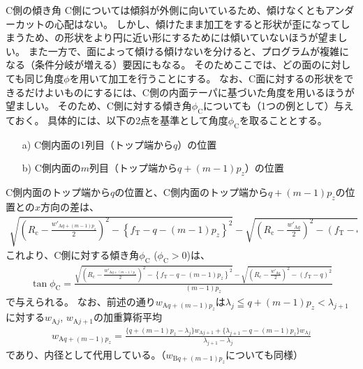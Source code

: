 \begin{Column}{C側\dimple の傾き角}
C側\dimple については傾斜が外側に向いているため、傾けなくともアンダーカットの心配はない。
しかし、傾けたまま加工をすると形状が歪になってしまうため、\dimple の形状をより円に近い形にするためには傾いていないほうが望ましい。
また一方で、面によって傾ける傾けないを分けると、プログラムが複雑になる（条件分岐が増える）要因にもなる。
そのためここでは、どの面の\dimple に対しても同じ角度$\phi$を用いて加工を行うことにする。
\tcbline*
なお、C面に対する\dimple の形状をできるだけよいものにするには、C側の内面テーパに基づいた角度を用いるほうが望ましい。
そのため、C側\dimple に対する傾き角$\phi_\mathrm C$についても（1つの例として）与えておく。
具体的には、以下の2点を基準として角度$\phi_\mathrm C$を取ることとする。
\begin{enumerate}
\item[a)] C側内面の\dimple1列目（トップ端から$q$）の位置
\item[b)] C側内面の\dimple$m$列目（トップ端から$q+(m-1)p_z$）の位置
\end{enumerate}
C側内面のトップ端から$q$の位置と、C側内面のトップ端から$q+(m-1)p_z$の位置との$x$方向の差は、
\begin{align*}
  \sqrt{\left(R_\mathrm c-\frac{w'_{\mathrm Aq+(m-1)p_z}}2\right)^{\!\!2}
        -\left\{f_\mathrm T-q-(m-1)p_z\right\}^2}
  -\sqrt{\left(R_\mathrm c-\frac{w'_{\mathrm Aq}}2\right)^{\!\!2}-(f_\mathrm T-q)^2}
\end{align*}
これより、C側\dimple に対する傾き角$\phi_\mathrm C$ ($\phi_\mathrm C > 0$)は、
\begin{align*}
  \tan\phi_\mathrm C
  = \frac{\displaystyle
          \sqrt{\left(R_\mathrm c-\frac{w'_{\mathrm Aq+(m-1)p_z}}2\right)^{\!2}
                -\left\{f_\mathrm T-q-(m-1)p_z\right\}^2}
          -\sqrt{\left(R_\mathrm c-\frac{w'_{\mathrm Aq}}2\right)^{\!2}-(f_\mathrm T-q)^2}}
         {(m-1)p_z}
\end{align*}
で与えられる。
なお、前述の通り$w_{\mathrm Aq+(m-1)p_z}$は$\lambda_j \leqq q+(m-1)p_z < \lambda_{j+1}$に対する$w_{\mathrm Aj}$, $w_{\mathrm Aj+1}$の加重算術平均
\begin{align*}
  w_{\mathrm Aq+(m-1)p_z}
  = \frac{\{q+(m-1)p_z-\lambda_j\}w_{\mathrm Aj+1}+\{\lambda_{j+1}-q-(m-1)p_z\}w_{\mathrm Aj}}
         {\lambda_{j+1}-\lambda_j}
\end{align*}
であり、内径として代用している。（$w_{\mathrm Bq+(m-1)p_z}$についても同様）
\end{Column}

